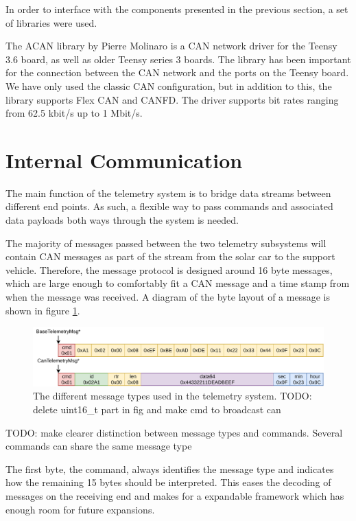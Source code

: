 \documentclass[conference]{IEEEtran}
\newcommand{\todo}[1]{{\color{olive} TODO: #1}}
\begin{document}
In order to interface with the components presented in the previous section, a set of libraries were used.

The ACAN library by Pierre Molinaro is a CAN network driver for the Teensy 3.6 board, as well as older Teensy series 3 boards. The library has been important for the connection between the CAN network and the ports on the Teensy board. We have only used the classic CAN configuration, but in addition to this, the library supports Flex CAN and CANFD. The driver supports bit rates ranging from 62.5 kbit/s up to 1 Mbit/s\cite{ACAN}.
% 

\section{Internal Communication}
The main function of the telemetry system is to bridge data streams between different end points. As such, a flexible way to pass commands and associated data payloads both ways through the system is needed. 

The majority of messages passed between the two telemetry subsystems will contain CAN messages as part of the stream from the solar car to the support vehicle. Therefore, the message protocol is designed around 16 byte messages, which are large enough to comfortably fit a CAN message and a time stamp from when the message was received. A diagram of the byte layout of a message is shown in figure \ref{fig:messageTypes}.

\begin{figure}
    \centering
    \includegraphics[width=\linewidth]{documentation/images/MessageTypes.pdf}
    \caption{The different message types used in the telemetry system.\todo{delete uint16\_t part in fig and make cmd to broadcast can}}
    \label{fig:messageTypes}
\end{figure}

\todo{make clearer distinction between message types and commands. Several commands can share the same message type}

The first byte, the command, always identifies the message type and indicates how the remaining 15 bytes should be interpreted. This eases the decoding of messages on the receiving end and makes for a expandable framework which has enough room for future expansions. 
\end{document}
